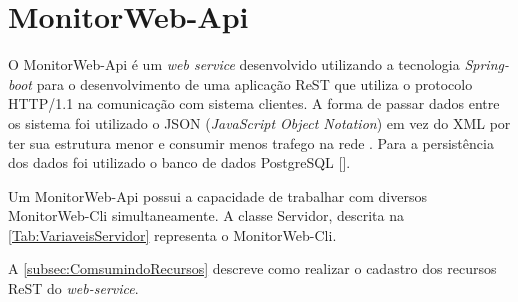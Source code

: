 

\section{MonitorWeb-Api}\label{sec:MonitorWeb-Api}

O MonitorWeb-Api é um \textit{web service} desenvolvido utilizando a tecnologia \textit{Spring-boot} para o desenvolvimento de uma aplicação ReST que utiliza o protocolo HTTP/1.1 na comunicação com sistema clientes. A forma de passar dados entre os sistema foi utilizado o JSON (\textit{JavaScript Object Notation}) em vez do XML por ter sua estrutura menor e consumir menos trafego na rede \cite{Saudate:2014}. Para a persistência dos dados foi utilizado o banco de dados PostgreSQL [\cite{Postgres}].

Um MonitorWeb-Api possui a capacidade de trabalhar com diversos MonitorWeb-Cli simultaneamente. A classe Servidor, descrita na \autoref{Tab:VariaveisServidor} representa o MonitorWeb-Cli.

A \autoref{subsec:ComsumindoRecursos} descreve como realizar o cadastro dos recursos ReST do \textit{web-service}. 


